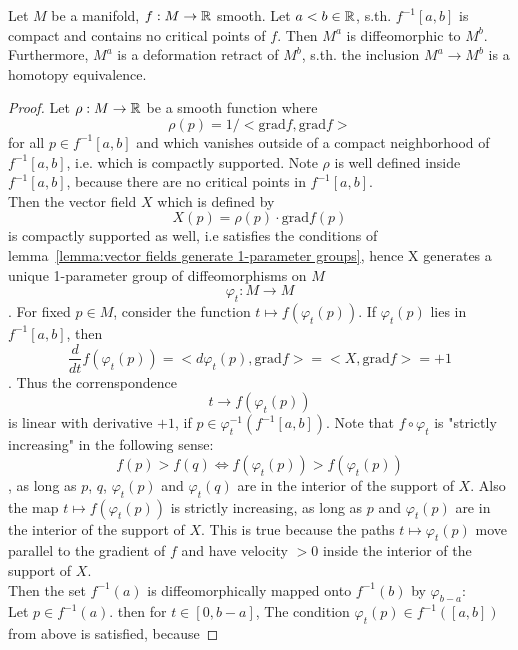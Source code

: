\begin{theorem}
   \label{theorem:1st deformation lemma}
   Let $M$ be a manifold, $f: M \rightarrow {\mathbb R}$ smooth. Let $a < b \in {\mathbb R}$, 
   s.th. $f^{-1}[a, b]$ is compact and contains no critical points of $f$. Then 
   $M^a$ is diffeomorphic to $M^b$. \\ 
   Furthermore, $M^a$ is a deformation retract of $M^b$, s.th. the 
   inclusion $M^a \rightarrow M^b$ is a homotopy equivalence.
\end{theorem}

\begin{proof}
   Let $\rho: M \rightarrow {\mathbb R}$ be a smooth function where 
   \[ \rho(p) = 1/<\text{grad} f, \text{grad} f> \]
   for all $p \in f^{-1}[a, b]$ and which vanishes outside of a compact 
   neighborhood of $f^{-1}[a, b]$, i.e. which is compactly supported.
   Note $\rho$ is well defined inside $f^{-1}[a, b]$, because there are no 
   critical points in $f^{-1}[a, b]$. \\ 
   Then the vector field $X$ which is defined by
   \[ X(p) = \rho(p) \cdot \text{grad} f (p) \]
   is compactly supported as well, i.e satisfies the conditions of 
   lemma~\ref{lemma:vector fields generate 1-parameter groups}, hence X generates 
   a unique 1-parameter group of diffeomorphisms on $M$
   \[ \varphi_t : M \rightarrow M \]. 
   For fixed $p \in M$, consider the function 
   $ t \mapsto f(\varphi_t(p)) $. If $\varphi_t(p)$ lies in $f^{-1}[a, b]$, then
   \[ \frac{d}{dt}f (\varphi_t(p)) = <d\varphi_t(p), \text{grad}f> = <X, \text{grad}f> = + 1 \].
   Thus the correnspondence 
   \[ t \rightarrow f(\varphi_t(p)) \]
   is linear with derivative $+1$, if $p \in \varphi_t^{-1}(f^{-1}[a, b])$. 
   Note that $f \circ \varphi_t$ is "strictly increasing" in the following sense:
   \[ f(p) > f(q) \Leftrightarrow f(\varphi_t(p)) > f(\varphi_t(p)) \]
   , as long as $p$, $q$, $\varphi_t(p)$ and $\varphi_t(q)$ are in the interior
   of the support of $X$. Also the map $t \mapsto f(\varphi_t(p))$ is strictly
   increasing, as long as $p$ and $\varphi_t(p)$ are in the interior of the
   support of $X$. This is true because the paths $t \mapsto \varphi_t(p)$ move
   parallel to the gradient of $f$ and have velocity $>0$ inside the interior 
   of the support of $X$. \\
   Then the set $f^{-1}(a)$ is diffeomorphically mapped onto $f^{-1}(b)$ by $\varphi_{b-a}$: \\
   Let $p \in f^{-1}(a)$. then for $t \in [0, b-a]$, The condition 
   $\varphi_t(p) \in f^{-1}([a, b])$ from above is satisfied, because

\end{proof}
